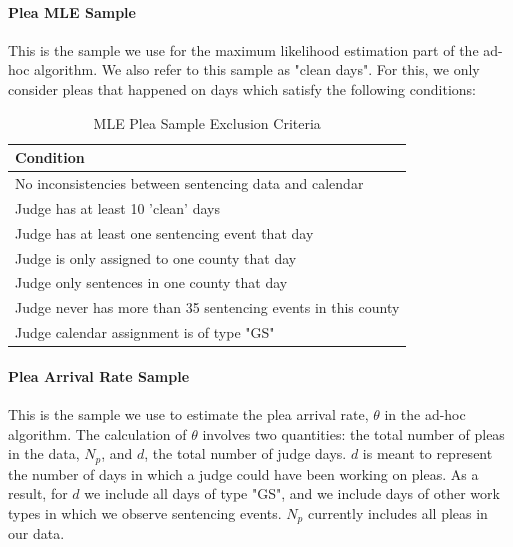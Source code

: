 \documentclass[11pt]{article}
\theoremstyle{ModifiedStyle}
\theoremstyle{ModifiedStyle}
\begin{document}
      \paragraph{Plea MLE Sample} This is the sample we use for the maximum likelihood estimation part of the ad-hoc algorithm. We also refer to this sample as "clean days". For this, we only consider pleas that happened on days which satisfy the following conditions:
        \begin{table}[H]
          \centering
          \caption{MLE Plea Sample Exclusion Criteria}
          \begin{tabular}{|l|}
          \hline
          \textbf{Condition}                                                  \\ \hline
          No inconsistencies between sentencing data and calendar \\ \hline
          Judge has at least 10 'clean' days                      \\ \hline
          Judge has at least one sentencing event that day         \\ \hline
          Judge is only assigned to one county that day          \\ \hline
          Judge only sentences in one county that day             \\ \hline
          Judge never has more than 35 sentencing events in this county \\ \hline
          Judge calendar assignment is of type "GS"           \\ \hline
          \end{tabular}
        \end{table}

      \paragraph{Plea Arrival Rate Sample} This is the sample we use to estimate the plea arrival rate, $\theta$ in the ad-hoc algorithm. The calculation of $\theta$ involves two quantities: the total number of pleas in the data, $N_p$, and $d$, the total number of judge days. $d$ is meant to represent the number of days in which a judge could have been working on pleas. As a result, for $d$ we include all days of type "GS", and we include days of other work types in which we observe sentencing events. $N_p$ currently includes all pleas in our data.
\end{document}
